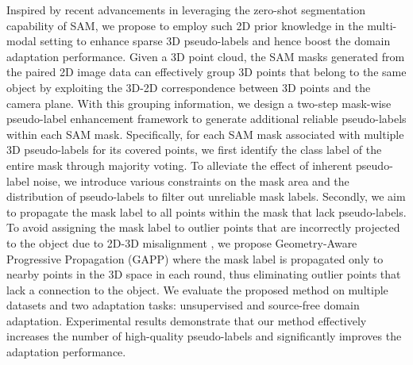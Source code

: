 Inspired by recent advancements in leveraging the zero-shot segmentation capability of SAM, we propose to employ such 2D prior knowledge in the multi-modal setting to enhance sparse 3D pseudo-labels and hence boost the domain adaptation performance. Given a 3D point cloud, the SAM masks generated from the paired 2D image data can effectively group 3D points that belong to the same object by exploiting the 3D-2D correspondence between 3D points and the camera plane. With this grouping information, we design a two-step mask-wise pseudo-label enhancement framework to generate additional reliable pseudo-labels within each SAM mask. 
Specifically, for each SAM mask associated with multiple 3D pseudo-labels for its covered points, we first identify the class label of the entire mask through majority voting. To alleviate the effect of inherent pseudo-label noise, we introduce various constraints on the mask area and the distribution of pseudo-labels to filter out unreliable mask labels. Secondly, we aim to propagate the mask label to all points within the mask that lack pseudo-labels. To avoid assigning the mask label to outlier points that are incorrectly projected to the object due to 2D-3D misalignment \cite{an2020geometric}, we propose Geometry-Aware Progressive Propagation (GAPP) where the mask label is propagated only to nearby points in the 3D space in each round, thus eliminating outlier points that lack a connection to the object.   
We evaluate the proposed method on multiple datasets and two adaptation tasks: unsupervised and source-free domain adaptation. Experimental results demonstrate that our method effectively increases the number of high-quality pseudo-labels and significantly improves the adaptation performance.

